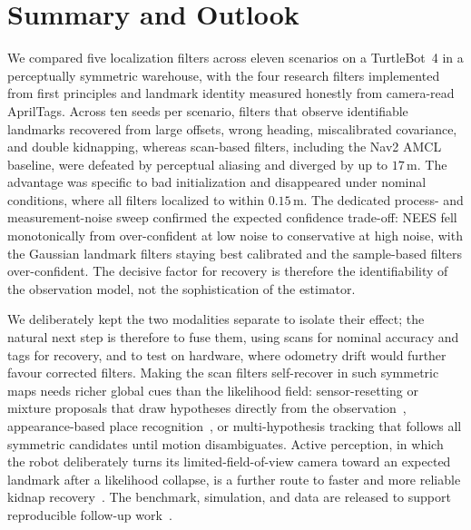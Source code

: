 \documentclass[conference]{IEEEtran}
\begin{document}
\section{Summary and Outlook}

We compared five localization filters across eleven scenarios on a TurtleBot~4 in a perceptually symmetric warehouse, with the four research filters implemented from first principles and landmark identity measured honestly from camera-read AprilTags. Across ten seeds per scenario, filters that observe identifiable landmarks recovered from large offsets, wrong heading, miscalibrated covariance, and double kidnapping, whereas scan-based filters, including the Nav2 AMCL baseline, were defeated by perceptual aliasing and diverged by up to $17$\,m. The advantage was specific to bad initialization and disappeared under nominal conditions, where all filters localized to within $0.15$\,m. The dedicated process- and measurement-noise sweep confirmed the expected confidence trade-off: NEES fell monotonically from over-confident at low noise to conservative at high noise, with the Gaussian landmark filters staying best calibrated and the sample-based filters over-confident. The decisive factor for recovery is therefore the identifiability of the observation model, not the sophistication of the estimator.

We deliberately kept the two modalities separate to isolate their effect; the natural next step is therefore to fuse them, using scans for nominal accuracy and tags for recovery, and to test on hardware, where odometry drift would further favour corrected filters. Making the scan filters self-recover in such symmetric maps needs richer global cues than the likelihood field: sensor-resetting or mixture proposals that draw hypotheses directly from the observation~\cite{Thrun2005}, appearance-based place recognition~\cite{Cummins2008,Lowry2016}, or multi-hypothesis tracking that follows all symmetric candidates until motion disambiguates. Active perception, in which the robot deliberately turns its limited-field-of-view camera toward an expected landmark after a likelihood collapse, is a further route to faster and more reliable kidnap recovery~\cite{Cadena2016}. The benchmark, simulation, and data are released to support reproducible follow-up work~\cite{Kummerle2009}.

\clearpage
{\small


}
\end{document}
